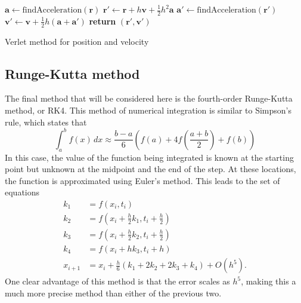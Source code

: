 \documentclass[aps,prc,reprint]{revtex4-1}
\begin{document}
            \begin{algorithm}[H]
                \begin{algorithmic}
                        \State $\mathbf{a} \gets \text{findAcceleration}(\mathbf{r})$
                        \State $\mathbf{r}' \gets \mathbf{r} + h \mathbf{v} + \frac{1}{2} h^2 \mathbf{a}$
                        \State $\mathbf{a}' \gets \text{findAcceleration}(\mathbf{r}')$
                        \State $\mathbf{v}' \gets \mathbf{v} + \frac{1}{2} h (\mathbf{a} + \mathbf{a}')$
                        \State \textbf{return} $(\mathbf{r}', \mathbf{v}')$
                    \EndFunction
                \end{algorithmic}
                \caption{Verlet method for position and velocity}
                \label{alg:verlet}
            \end{algorithm}

    \subsection{Runge-Kutta method}
    \label{sub:rk4}

        The final method that will be considered here is the fourth-order Runge-Kutta method, or RK4. This method of numerical integration is similar to Simpson's rule, which states that \cite{Stewart2008}
        \begin{equation*}
            \int_{a}^{b} f(x)\,dx \approx \frac{b-a}{6} \left( f(a) + 4 f\!\left(\frac{a+b}{2}\right) + f(b) \right)
        \end{equation*}
        In this case, the value of the function being integrated is known at the starting point but unknown at the midpoint and the end of the step. At these locations, the function is approximated using Euler's method. This leads to the set of equations \cite{Hjorth-Jensen2016}
        \begin{align}
            k_1     &= f(x_i, t_i) \\
            k_2     &= f(x_i + \tfrac{h}{2} k_1, t_i + \tfrac{h}{2}) \\
            k_3     &= f(x_i + \tfrac{h}{2} k_2, t_i + \tfrac{h}{2}) \\
            k_4     &= f(x_i + h k_3, t_i + h) \\
            x_{i+1} &= x_i + \tfrac{h}{6}(k_1 + 2k_2 + 2k_3 + k_4) + O(h^5).
        \end{align}
        One clear advantage of this method is that the error scales as $h^5$, making this a much more precise method than either of the previous two. \cite{Hjorth-Jensen2016}
\end{document}
